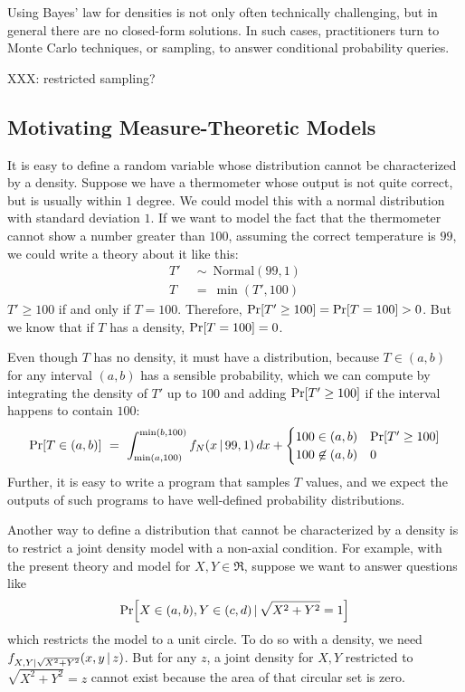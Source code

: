 Using Bayes' law for densities is not only often technically challenging, but in general there are no closed-form solutions.
In such cases, practitioners turn to Monte Carlo techniques, or sampling, to answer conditional probability queries.

XXX: restricted sampling?

\subsection{Motivating Measure-Theoretic Models}

It is easy to define a random variable whose distribution cannot be characterized by a density.
Suppose we have a thermometer whose output is not quite correct, but is usually within $1$ degree.
We could model this with a normal distribution with standard deviation $1$.
If we want to model the fact that the thermometer cannot show a number greater than $100$, assuming the correct temperature is $99$, we could write a theory about it like this:
\begin{equation}
\begin{aligned}
	T'&\ \sim\ \mathrm{Normal}(99,1) \\
	T&\ =\ \min(T',100)
\end{aligned}
\end{equation}
$T' \ge 100$ if and only if $T = 100$.
Therefore, $\mathrm{Pr}\!\left[{T' \ge 100}\right] = \mathrm{Pr}\!\left[{T = 100}\right] > 0$.
But we know that if $T$ has a density, $\mathrm{Pr}\!\left[{T = 100}\right] = 0$.

Even though $T$ has no density, it must have a distribution, because $T \in (a,b)$ for any interval $(a,b)$ has a sensible probability, which we can compute by integrating the density of $T'$ up to $100$ and adding $\mathrm{Pr}\!\left[{T' \ge 100}\right]$ if the interval happens to contain $100$:
\begin{equation}
	\Pspec{T \in (a,b)}\ =\ \int_{\min(a,100)}^{\min(b,100)} f_N(x \given 99,1)\,dx +
	\begin{cases}
		100 \in (a,b) & \Pspec{T' \ge 100} \\
		100 \notin (a,b) & 0
	\end{cases}
\end{equation}
Further, it is easy to write a program that samples $T$ values, and we expect the outputs of such programs to have well-defined probability distributions.

Another way to define a distribution that cannot be characterized by a density is to restrict a joint density model with a non-axial condition.
For example, with the present theory and model for $X,Y \in \Re$, suppose we want to answer questions like
\begin{equation}
	\mathrm{Pr}\!\left[{X \in (a,b),Y \in (c,d) \,|\, \sqrt{X^2 + Y^2} = 1}\right]
\end{equation}
which restricts the model to a unit circle.
To do so with a density, we need $f_{X,Y|\sqrt{X^2+Y^2}}(x,y \,|\, z)$.
But for any $z$, a joint density for $X,Y$ restricted to $\sqrt{X^2+Y^2} = z$ cannot exist because the area of that circular set is zero.

